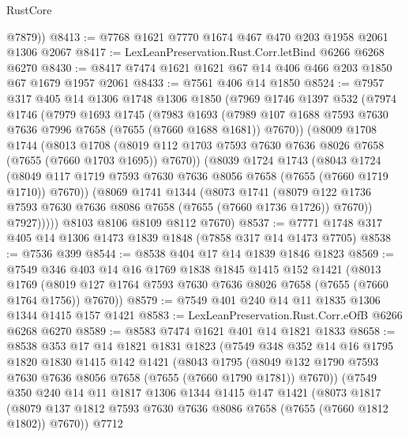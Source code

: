 \begin{lexlean}{RustCore}
\begin{coremodule}
        @7879))
@8413 := @7768 @1621 @7770 @1674 @467 @470 @203 @1958 @2061 @1306 @2067
@8417 := LexLeanPreservation.Rust.Corr.letBind @6266 @6268 @6270
@8430 := @8417 @7474 @1621 @1621 @67 @14 @406 @466 @203 @1850 @67 @1679 @1957 @2061
@8433 := @7561 @406 @14 @1850
@8524 := @7957
    @317
    @405
    @14
    @1306
    @1748
    @1306
    @1850
    (@7969
      @1746
      @1397
      @532
      (@7974
        @1746
        (@7979
          @1693
          @1745
          (@7983
            @1693
            (@7989 @107 @1688 @7593 @7630 @7636 @7996 @7658 (@7655 (@7660 @1688 @1681)) @7670))
          (@8009
            @1708
            @1744
            (@8013
              @1708
              (@8019 @112 @1703 @7593 @7630 @7636 @8026 @7658 (@7655 (@7660 @1703 @1695)) @7670))
            (@8039
              @1724
              @1743
              (@8043
                @1724
                (@8049 @117 @1719 @7593 @7630 @7636 @8056 @7658 (@7655 (@7660 @1719 @1710)) @7670))
              (@8069
                @1741
                @1344
                (@8073
                  @1741
                  (@8079
                    @122
                    @1736
                    @7593
                    @7630
                    @7636
                    @8086
                    @7658
                    (@7655 (@7660 @1736 @1726))
                    @7670))
                @7927)))))
      @8103
      @8106
      @8109
      @8112
      @7670)
@8537 := @7771 @1748 @317 @405 @14 @1306 @1473 @1839 @1848 (@7858 @317 @14 @1473 @7705)
@8538 := @7536 @399
@8544 := @8538 @404 @17 @14 @1839 @1846 @1823
@8569 := @7549
    @346
    @403
    @14
    @16
    @1769
    @1838
    @1845
    @1415
    @152
    @1421
    (@8013 @1769 (@8019 @127 @1764 @7593 @7630 @7636 @8026 @7658 (@7655 (@7660 @1764 @1756)) @7670))
@8579 := @7549 @401 @240 @14 @11 @1835 @1306 @1344 @1415 @157 @1421
@8583 := LexLeanPreservation.Rust.Corr.eOfB @6266 @6268 @6270
@8589 := @8583 @7474 @1621 @401 @14 @1821 @1833
@8658 := @8538
    @353
    @17
    @14
    @1821
    @1831
    @1823
    (@7549
      @348
      @352
      @14
      @16
      @1795
      @1820
      @1830
      @1415
      @142
      @1421
      (@8043
        @1795
        (@8049 @132 @1790 @7593 @7630 @7636 @8056 @7658 (@7655 (@7660 @1790 @1781)) @7670))
      (@7549
        @350
        @240
        @14
        @11
        @1817
        @1306
        @1344
        @1415
        @147
        @1421
        (@8073
          @1817
          (@8079 @137 @1812 @7593 @7630 @7636 @8086 @7658 (@7655 (@7660 @1812 @1802)) @7670))
        @7712

\end{coremodule}
\end{lexlean}

